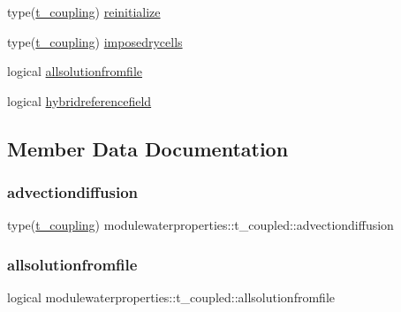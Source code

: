 \begin{DoxyCompactItemize}
\item 
type(\mbox{\hyperlink{structmodulewaterproperties_1_1t__coupling}{t\+\_\+coupling}}) \mbox{\hyperlink{structmodulewaterproperties_1_1t__coupled_af1a7fd021868ebc94e51e5b9a3fbb89a}{reinitialize}}
\item 
type(\mbox{\hyperlink{structmodulewaterproperties_1_1t__coupling}{t\+\_\+coupling}}) \mbox{\hyperlink{structmodulewaterproperties_1_1t__coupled_abcbfc689220c350c7b8a4ff6a94c3744}{imposedrycells}}
\item 
logical \mbox{\hyperlink{structmodulewaterproperties_1_1t__coupled_a772bd04220ca30616357a397d804efe1}{allsolutionfromfile}}
\item 
logical \mbox{\hyperlink{structmodulewaterproperties_1_1t__coupled_a560139710fbef0fc77fb6fa9f78e0d6e}{hybridreferencefield}}
\end{DoxyCompactItemize}


\subsection{Member Data Documentation}
\mbox{\label{structmodulewaterproperties_1_1t__coupled_a96a65830d47773c0ea434a38ed6264bb}} 
\subsubsection{\texorpdfstring{advectiondiffusion}{advectiondiffusion}}
{\footnotesize\ttfamily type(\mbox{\hyperlink{structmodulewaterproperties_1_1t__coupling}{t\+\_\+coupling}}) modulewaterproperties\+::t\+\_\+coupled\+::advectiondiffusion\hspace{0.3cm}{\ttfamily [private]}}

\mbox{\label{structmodulewaterproperties_1_1t__coupled_a772bd04220ca30616357a397d804efe1}} 
\subsubsection{\texorpdfstring{allsolutionfromfile}{allsolutionfromfile}}
{\footnotesize\ttfamily logical modulewaterproperties\+::t\+\_\+coupled\+::allsolutionfromfile\hspace{0.3cm}{\ttfamily [private]}}

